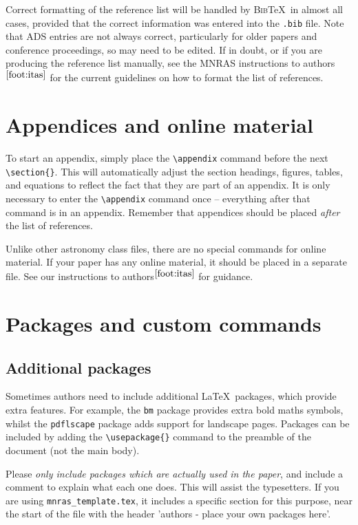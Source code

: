 \documentclass[fleqn,usenatbib,useAMS]{mnras}
\newcommand{\bibtex}{\textsc{Bib}\!\TeX} %
\begin{document}
Correct formatting of the reference list will be handled by \bibtex\ in almost all cases, provided that the correct information was entered into the \verb'.bib' file.
Note that ADS entries are not always correct, particularly for older papers and conference proceedings, so may need to be edited.
If in doubt, or if you are producing the reference list manually, see the MNRAS instructions to authors$^{\ref{foot:itas}}$ for the current guidelines on how to format the list of references.

\section{Appendices and online material}

To start an appendix, simply place the \verb'\appendix' command before the next \verb'\section{}'.
This will automatically adjust the section headings, figures, tables, and equations to reflect the fact that they are part of an appendix.
It is only necessary to enter the \verb'\appendix' command once -- everything after that command is in an appendix.
Remember that appendices should be placed \textit{after} the list of references.

Unlike other astronomy class files, there are no special commands for online material.
If your paper has any online material, it should be placed in a separate file.
See our instructions to authors$^{\ref{foot:itas}}$ for guidance.

\section{Packages and custom commands}
\label{sec:packages}
\subsection{Additional packages}

Sometimes authors need to include additional \LaTeX\ packages, which provide extra features.
For example, the \verb'bm' package provides extra bold maths symbols, whilst the \verb'pdflscape' package adds support for landscape pages.
Packages can be included by adding the \verb'\usepackage{}' command to the preamble of the document (not the main body).

Please \emph{only include packages which are actually used in the paper}, and include a comment to explain what each one does.
This will assist the typesetters.
If you are using \texttt{mnras\_template.tex}, it includes a specific section for this purpose, near the start of the file with the header 'authors - place your own packages here'.
\end{document}
